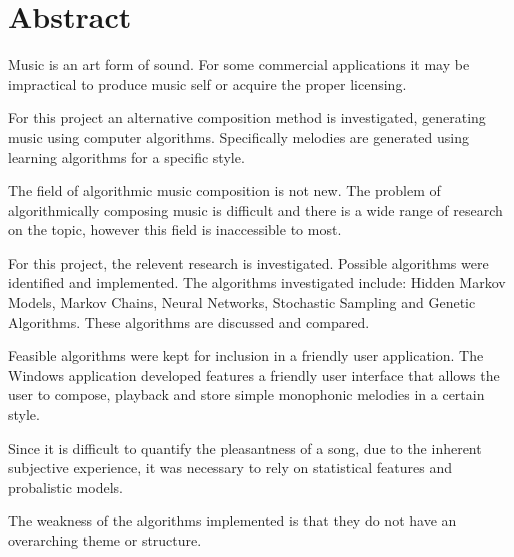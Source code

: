 \begingroup
\let\clearpage\relax
\let\cleardoublepage\relax
\let\cleardoublepage\relax

\chapter*{Abstract}

Music is an art form of sound. For some commercial applications it may be impractical to produce music self or acquire the proper licensing. 

For this project an alternative composition method is investigated, generating music using computer algorithms. Specifically melodies are generated using learning algorithms for a specific style.

The field of algorithmic music composition is not new. The problem of algorithmically composing music is difficult and there is a wide range of research on the topic, however this field is inaccessible to most. 

For this project, the relevent research is investigated. Possible algorithms were identified and implemented. The algorithms investigated include: Hidden Markov Models, Markov Chains, Neural Networks, Stochastic Sampling and Genetic Algorithms. These algorithms are discussed and compared.

Feasible algorithms were kept for inclusion in a friendly user application. 
The Windows application developed features a friendly user interface that allows the user to compose, playback and store simple monophonic melodies in a certain style. 

Since it is difficult to quantify the pleasantness of a song, due to the inherent subjective experience, it was necessary to rely on statistical features and probalistic models. 

The weakness of the algorithms implemented is that they do not have an overarching theme or structure. 

\vfill



\endgroup			

\vfill